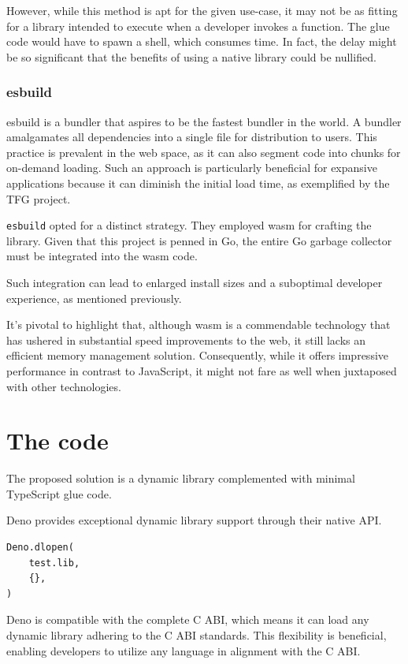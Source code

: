 \documentclass[10pt,journal,compsoc]{IEEEtran}
\begin{document}
However, while this method is apt for the given use-case, it may not be as fitting for a library intended to execute when a developer invokes a function. The glue code would have to spawn a shell, which consumes time. In fact, the delay might be so significant that the benefits of using a native library could be nullified.

\subsubsection{esbuild}

esbuild is a bundler \cite{Bundler} that aspires to be the fastest bundler in the world. A bundler amalgamates all dependencies into a single file for distribution to users. This practice is prevalent in the web space, as it can also segment code into chunks for on-demand loading. Such an approach is particularly beneficial for expansive applications because it can diminish the initial load time, as exemplified by the TFG \cite{TFG} project.

\verb|esbuild| opted for a distinct strategy. They employed wasm \cite{WASM} \cite{WASMSPEC} for crafting the library. Given that this project is penned in Go, the entire Go garbage collector must be integrated into the wasm code.

Such integration can lead to enlarged install sizes and a suboptimal developer experience, as mentioned previously.

It's pivotal to highlight that, although wasm is a commendable technology that has ushered in substantial speed improvements to the web, it still lacks an efficient memory management solution. Consequently, while it offers impressive performance in contrast to JavaScript, it might not fare as well when juxtaposed with other technologies.

\section{The code}
The proposed solution is a dynamic library complemented with minimal TypeScript glue code.

Deno provides exceptional dynamic library support through their native API.

\begin{lstlisting}
Deno.dlopen(
    test.lib,
    {},
)
\end{lstlisting}

Deno is compatible with the complete C ABI, which means it can load any dynamic library adhering to the C ABI standards. This flexibility is beneficial, enabling developers to utilize any language in alignment with the C ABI.
\end{document}
